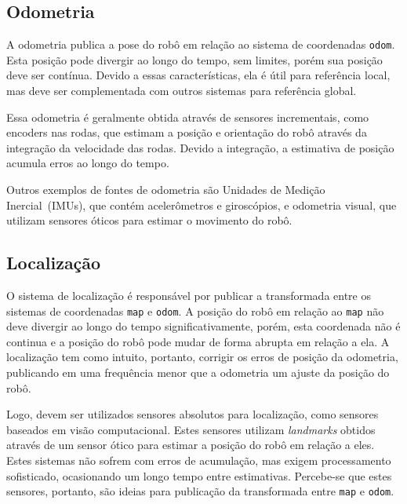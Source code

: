 \documentclass[repeatfields,xlists,xpacks,oneside,yearsonly]{ufrgscca}
\begin{document}

\subsection{Odometria}

A odometria publica a pose do robô em relação ao sistema de
coordenadas \texttt{odom}. Esta posição pode divergir ao longo do
tempo, sem limites, porém sua posição deve ser contínua. Devido a
essas características, ela é útil para referência local, mas deve ser
complementada com outros sistemas para referência global.

Essa odometria é geralmente obtida através de sensores incrementais,
como encoders nas rodas, que estimam a posição e orientação do robô
através da integração da velocidade das rodas. Devido a integração, a
estimativa de posição acumula erros ao longo do tempo.

Outros exemplos de fontes de odometria são Unidades de Medição
Inercial~(IMUs), que contém acelerômetros e giroscópios, e odometria
visual, que utilizam sensores óticos para estimar o movimento do
robô.


\subsection{Localização}

O sistema de localização é responsável por publicar a transformada
entre os sistemas de coordenadas \texttt{map} e \texttt{odom}. A
posição do robô em relação ao \texttt{map} não deve divergir ao longo
do tempo significativamente, porém, esta coordenada não é continua e
a posição do robô pode mudar de forma abrupta em relação a ela. A
localização tem como intuito, portanto, corrigir os erros de posição
da odometria, publicando em uma frequência menor que a odometria um
ajuste da posição do robô.

Logo, devem ser utilizados sensores absolutos para localização, como
sensores baseados em visão computacional. Estes sensores utilizam
\textit{landmarks} obtidos através de um sensor ótico para estimar a
posição do robô em relação a eles. Estes sistemas não sofrem com
erros de acumulação, mas exigem processamento sofisticado,
ocasionando um longo tempo entre estimativas. Percebe-se que estes
sensores, portanto, são ideias para publicação da transformada entre
\texttt{map} e \texttt{odom}.
\end{document}
